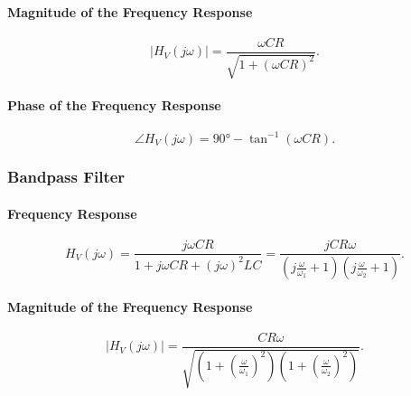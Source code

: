 \paragraph{Magnitude of the Frequency Response}
\begin{equation*}
  \left| H_V(j\omega) \right| = \frac{\omega CR}{\sqrt{1 + \left( \omega CR \right)^2}}
.\end{equation*}

\begin{symbols}
\end{symbols}

\paragraph{Phase of the Frequency Response}
\begin{equation*}
  \angle H_V(j\omega) = \ang{90} - \tan^{-1} \left( \omega CR \right)
.\end{equation*}

\begin{symbols}
\end{symbols}


\subsubsection{Bandpass Filter}

\paragraph{Frequency Response}
\begin{equation*}
  H_V (j\omega) = \frac{j \omega CR}{1 + j \omega CR + \left( j \omega \right)^2 LC} = \frac{j CR \omega}{\left( j \frac{\omega}{\omega_1} + 1 \right) \left( j \frac{\omega}{\omega_2} + 1 \right)}
.\end{equation*}

\begin{symbols}
\end{symbols}

\paragraph{Magnitude of the Frequency Response}
\begin{equation*}
  \left| H_V(j\omega) \right| = \frac{CR \omega}{\sqrt{\left( 1 + \left( \frac{\omega}{\omega_1} \right)^2 \right) \left( 1 + \left( \frac{\omega}{\omega_2} \right)^2 \right)}}
.\end{equation*}


